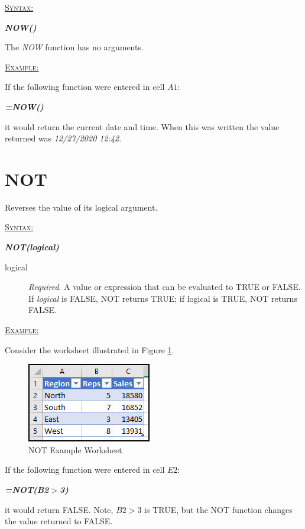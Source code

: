 \begin{addmargin}[1cm]{0cm}
	
	\medskip
	\underline{\textsc{Syntax:}}
	\medskip
	
	{\color{Syntax}
		\noindent\textbf{\textit{NOW()}}
	}
	
	\medskip
	\noindent The \textit{NOW} function has no arguments.
	
	\medskip
	\noindent\underline{\textsc{Example:}}
	\medskip
	
	\noindent If the following function were entered in cell $ A1 $:
	
	{\color{Syntax}
		\textit{\textbf{=NOW()}}
	}
	
	\noindent it would return the current date and time. When this was written the value returned was \textit{12/27/2020 12:42}.
		
\end{addmargin}

\section{NOT}

Reverses the value of its logical argument. 

\begin{addmargin}[1cm]{0cm}
	
	\medskip
	\underline{\textsc{Syntax:}}
	\medskip
	
	{\color{Syntax}
		\noindent\textbf{\textit{NOT(logical)}}
	}
	
	\begin{description}
		\item[logical] \textit{Required}. A value or expression that can be evaluated to TRUE or FALSE. If \textit{logical} is FALSE, NOT returns TRUE; if logical is TRUE, NOT returns FALSE.
	\end{description}

	\medskip
\noindent\underline{\textsc{Example:}}
\medskip

\noindent Consider the worksheet illustrated in Figure \ref{apa:not}.

\begin{figure}[H]
	\centering
	\includegraphics[width=\maxwidth{.45\linewidth}]{gfx/apa_fig01}
	\caption{NOT Example Worksheet}
	\label{apa:not}
\end{figure}

\noindent If the following function were entered in cell $ E2 $:

{\color{Syntax}
	\textit{\textbf{=NOT(B2$ > $3)}}
}

\noindent it would return FALSE. Note, $ B2 > 3 $ is TRUE, but the NOT function changes the value returned to FALSE.

\end{addmargin}

